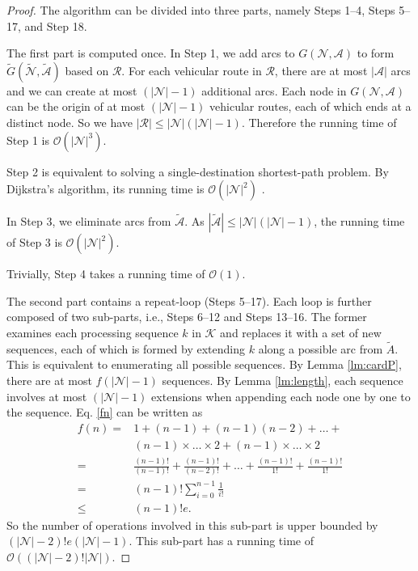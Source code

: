 \documentclass[journal]{IEEEtran}
\begin{document}
\begin{proof}
The algorithm can be divided into three parts, namely Steps 1--4, Steps 5--17, and Step 18.

The first part is computed once. In Step 1, we add arcs to $G(\mathcal{N},\mathcal{A})$ to form $\tilde{G}(\tilde{\mathcal{N}},\tilde{\mathcal{A}})$ based on $\mathcal{R}$. For each vehicular route in $\mathcal{R}$, there are at most $|\mathcal{A}|$ arcs and we can create at most $(|\mathcal{N}|-1)$ additional arcs. Each node in $G(\mathcal{N},\mathcal{A})$ can be the origin of at most $(|\mathcal{N}|-1)$ vehicular routes, each of which ends at a distinct node. So we have $|\mathcal{R}|\leq |\mathcal{N}|(|\mathcal{N}|-1)$. Therefore the running time of Step 1 is $\mathcal{O}(|\mathcal{N}|^3)$.

Step 2 is equivalent to solving a single-destination shortest-path problem. By Dijkstra's algorithm, its running time is $\mathcal{O}(|\mathcal{N}|^2)$ \cite{dijkstra}.

In Step 3, we eliminate arcs from $\tilde{\mathcal{A}}$. As $|\tilde{\mathcal{A}}|\leq |\mathcal{N}|(|\mathcal{N}|-1)$, the running time of Step 3 is $\mathcal{O}(|\mathcal{N}|^2)$.

Trivially, Step 4 takes a running time of $\mathcal{O}(1)$.

The second part contains a repeat-loop (Steps 5--17). Each loop is further composed of two sub-parts, i.e., Steps 6--12 and Steps 13--16. The former examines each processing sequence $k$ in $\mathcal{K}$ and replaces it with a set of new sequences, each of which is formed by extending $k$ along a possible arc from $\tilde{A}$. This is equivalent to enumerating all possible sequences. By Lemma \ref{lm:cardP}, there are at most $f(|\mathcal{N}|-1)$ sequences. By Lemma \ref{lm:length}, each sequence involves at most $(|\mathcal{N}|-1)$ extensions when appending each node one by one to the sequence.
Eq. \eqref{fn} can be written as
\begin{align*}
f(n) =& 1+(n-1)+(n-1)(n-2)+\ldots+\\
			&(n-1)\times\ldots\times 2 + (n-1)\times\ldots\times 2 \\
		=& \frac{(n-1)!}{(n-1)!} + \frac{(n-1)!}{(n-2)!}+ \ldots + \frac{(n-1)!}{1!}+\frac{(n-1)!}{1!}\\
=&(n-1)! \sum_{i=0}^{n-1}{\frac{1}{i!}}\\
		\leq& (n-1)!e.
\end{align*}
So the number of operations involved in this sub-part is upper bounded by $(|\mathcal{N}|-2)!e(|\mathcal{N}|-1)$.
 This sub-part has a running time of $\mathcal{O}((|\mathcal{N}|-2)!|\mathcal{N}|)$.


\end{proof}
\end{document}
